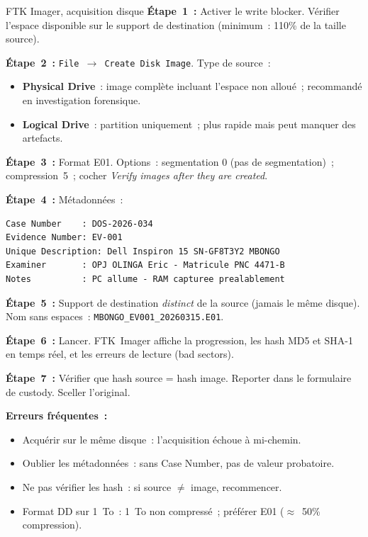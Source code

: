 \begin{boxoutils}{FTK Imager, acquisition disque}
\textbf{Étape~1~:} Activer le write blocker. Vérifier l'espace disponible
sur le support de destination (minimum~: 110\% de la taille source).

\textbf{Étape~2~:} \texttt{File~$\to$ Create Disk Image}. Type de source~:
\begin{itemize}
    \item \textbf{Physical Drive}~: image complète incluant l'espace
          non alloué~; recommandé en investigation forensique.
    \item \textbf{Logical Drive}~: partition uniquement~; plus rapide
          mais peut manquer des artefacts.
\end{itemize}

\textbf{Étape~3~:} Format E01. Options~: segmentation 0 (pas de segmentation)~;
compression~5~; cocher \textit{Verify images after they are created}.

\textbf{Étape~4~:} Métadonnées~:
\begin{lstlisting}[language=bash_forensique]
Case Number    : DOS-2026-034
Evidence Number: EV-001
Unique Description: Dell Inspiron 15 SN-GF8T3Y2 MBONGO
Examiner       : OPJ OLINGA Eric - Matricule PNC 4471-B
Notes          : PC allume - RAM capturee prealablement
\end{lstlisting}

\textbf{Étape~5~:} Support de destination \emph{distinct} de la source
(jamais le même disque). Nom sans espaces~:
\texttt{MBONGO\_EV001\_20260315.E01}.

\textbf{Étape~6~:} Lancer. FTK~Imager affiche la progression, les hash
MD5 et SHA-1 en temps réel, et les erreurs de lecture (bad sectors).

\textbf{Étape~7~:} Vérifier que hash source = hash image. Reporter dans
le formulaire de custody. Sceller l'original.
\end{boxoutils}

\begin{boxalert}
\textbf{Erreurs fréquentes~:}
\begin{itemize}
    \item Acquérir sur le même disque~: l'acquisition échoue à mi-chemin.
    \item Oublier les métadonnées~: sans Case Number, pas de valeur probatoire.
    \item Ne pas vérifier les hash~: si source $\neq$ image, recommencer.
    \item Format DD sur 1~To~: 1~To non compressé~; préférer E01
          ($\approx$~50\% compression).
\end{itemize}
\end{boxalert}

